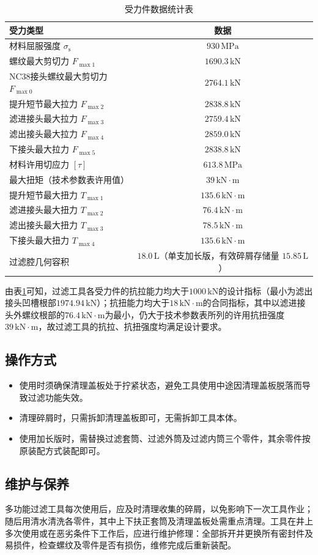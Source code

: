 \begin{table}[htbp]
    \centering
    \caption{受力件数据统计表}
    \label{tab:force_data_filter}
    \renewcommand{\arraystretch}{1.5} %
    \begin{tabularx}{.9\textwidth}{Xc}
        \toprule %
        受力类型 & 数据 \\
        \midrule %
        材料屈服强度 $\sigma_{\mathrm{s}}$ & $930\,\text{MPa}$ \\
        螺纹最大剪切力 $F_{\max1}$ & $1690.3\,\text{kN}$ \\
        NC38接头螺纹最大剪切力 $F_{\max0}$ & $2764.1\,\text{kN}$ \\
        提升短节最大拉力 $F_{\max2}$ & $2838.8\,\text{kN}$ \\
        滤进接头最大拉力 $F_{\max3}$ & $2759.4\,\text{kN}$ \\
        滤出接头最大拉力 $F_{\max4}$ & $2859.0\,\text{kN}$ \\
        下接头最大拉力 $F_{\max5}$ & $2838.8\,\text{kN}$ \\
        材料许用切应力 $[\tau]$ & $613.8\,\text{MPa}$ \\
        最大扭矩（技术参数表许用值） & $39\,\text{kN}\cdot\text{m}$ \\
        提升短节最大扭力 $T_{\max1}$ & $135.6\,\text{kN}\cdot\text{m}$ \\
        滤进接头最大扭力 $T_{\max2}$ & $76.4\,\text{kN}\cdot\text{m}$ \\
        滤出接头最大扭力 $T_{\max3}$ & $78.5\,\text{kN}\cdot\text{m}$ \\
        下接头最大扭力 $T_{\max4}$ & $135.6\,\text{kN}\cdot\text{m}$ \\
        过滤腔几何容积 & $18.0\,\text{L}$（单支加长版，有效碎屑存储量 $15.85\,\text{L}$） \\
        \bottomrule %
    \end{tabularx}
\end{table}

由表\ref{tab:force_data_filter}可知，过滤工具各受力件的抗拉能力均大于$1000\,\text{kN}$的设计指标（最小为滤出接头凹槽根部$1974.94\,\text{kN}$）；抗扭能力均大于$18\,\text{kN}\cdot\text{m}$的合同指标，其中以滤进接头外螺纹根部的$76.4\,\text{kN}\cdot\text{m}$为最小，仍大于技术参数表所列的许用抗扭强度$39\,\text{kN}\cdot\text{m}$，故过滤工具的抗拉、抗扭强度均满足设计要求。


\subsection{操作方式}
\begin{itemize}
	\item 使用时须确保清理盖板处于拧紧状态，避免工具使用中途因清理盖板脱落而导致过滤功能失效。
	\item 清理碎屑时，只需拆卸清理盖板即可，无需拆卸工具本体。
	\item 使用加长版时，需替换过滤套筒、过滤外筒及过滤内筒三个零件，其余零件按原装配方式装配即可。
\end{itemize}


\subsection{维护与保养}

多功能过滤工具每次使用后，应及时清理收集的碎屑，以免影响下一次工具作业；随后用清水清洗各零件，其中上下扶正套筒及清理盖板处需重点清理。工具在井上多次使用或在恶劣条件下工作后，应进行维护修理：全部拆开并更换所有密封件及易损件，检查螺纹及零件是否有损伤，维修完成后重新装配。

